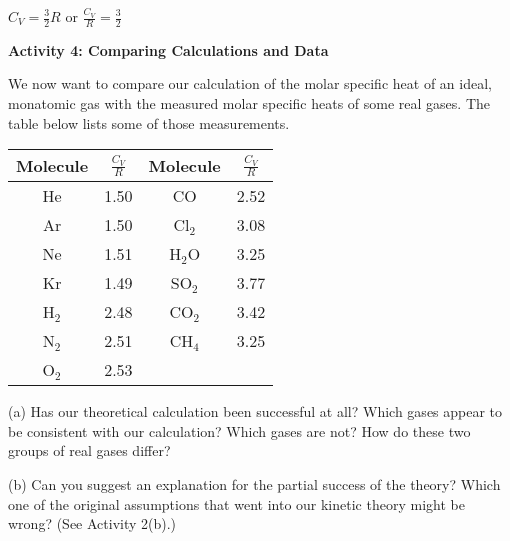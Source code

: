 {\centering \( C_{V}=\frac{3}{2}R \) or \( \frac{C_{V}}{R}=\frac{3}{2} \)\par}
\vspace{0.3in}

\textbf{Activity 4: Comparing Calculations and Data}

We now want to compare our calculation of the molar specific heat
of an ideal, monatomic gas with the measured molar specific heats
of some real gases. The table below lists some of those measurements.

\vspace{0.3cm}
{\centering \begin{tabular}{|c|c|c|c|}
\hline 
Molecule&
\( \frac{C_{V}}{R} \)&
Molecule&
\( \frac{C_{V}}{R} \)\\
\hline
\hline 
He&
1.50&
CO&
2.52\\
\hline 
Ar&
1.50&
Cl\( _{2} \)&
3.08\\
\hline 
Ne&
1.51&
H\( _{2} \)O&
3.25\\
\hline 
Kr&
1.49&
SO\( _{2} \)&
3.77\\
\hline 
H\( _{2} \)&
2.48&
CO\( _{2} \)&
3.42\\
\hline 
N\( _{2} \)&
2.51&
CH\( _{4} \)&
3.25\\
\hline 
O\( _{2} \)&
2.53&
&
\\
\hline
\end{tabular}\par}
\vspace{0.3cm}

(a) Has our theoretical calculation been successful at all? Which
gases appear to be consistent with our calculation? Which gases are
not? How do these two groups of real gases differ?
\answerspace{1in}

(b) Can you suggest an explanation for the partial success of the
theory? Which one of the original assumptions that went into our kinetic
theory might be wrong? (See Activity 2(b).)
\answerspace{2in}

